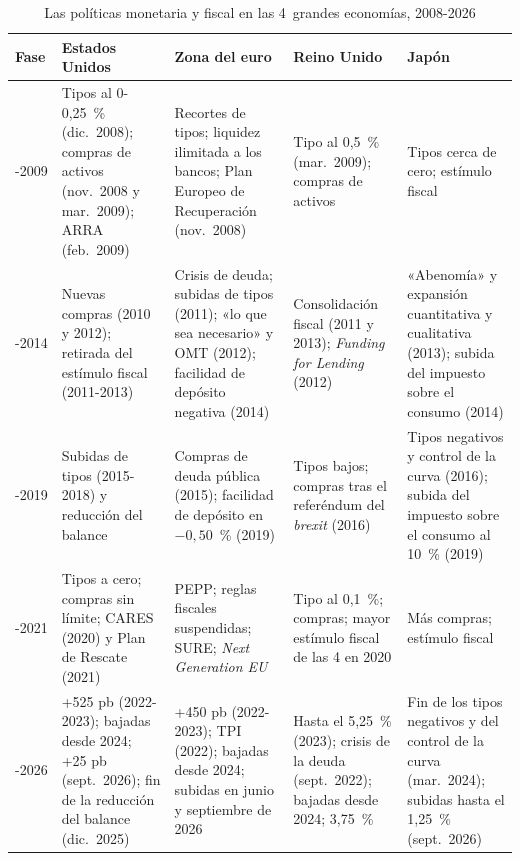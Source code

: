 \documentclass[11pt]{article}
\begin{document}
\begin{table}[H]
\centering
\caption{Las políticas monetaria y fiscal en las 4~grandes economías, 2008-2026}\label{tab:cronologia}
\footnotesize
\begin{tabular}{>{\centering\arraybackslash}m{1.5cm}|>{\raggedright\arraybackslash}m{3.4cm}|>{\raggedright\arraybackslash}m{3.4cm}|>{\raggedright\arraybackslash}m{3.0cm}|>{\raggedright\arraybackslash}m{3.0cm}}
\rowcolor{tceeazulpalido}\textbf{Fase} & \textbf{Estados Unidos} & \textbf{Zona del euro} & \textbf{Reino Unido} & \textbf{Japón}\\
\hline
2008-2009 & Tipos al 0-0,25~\% (dic.~2008); compras de activos (nov.~2008 y mar.~2009); ARRA (feb.~2009) & Recortes de tipos; liquidez ilimitada a los bancos; Plan Europeo de Recuperación (nov.~2008) & Tipo al 0,5~\% (mar.~2009); compras de activos & Tipos cerca de cero; estímulo fiscal\\
\hline
2010-2014 & Nuevas compras (2010 y 2012); retirada del estímulo fiscal (2011-2013) & Crisis de deuda; subidas de tipos (2011); «lo que sea necesario» y OMT (2012); facilidad de depósito negativa (2014) & Consolidación fiscal (2011 y 2013); \emph{Funding for Lending} (2012) & «Abenomía» y expansión cuantitativa y cualitativa (2013); subida del impuesto sobre el consumo (2014)\\
\hline
2015-2019 & Subidas de tipos (2015-2018) y reducción del balance & Compras de deuda pública (2015); facilidad de depósito en $-0{,}50$~\% (2019) & Tipos bajos; compras tras el referéndum del \emph{brexit} (2016) & Tipos negativos y control de la curva (2016); subida del impuesto sobre el consumo al 10~\% (2019)\\
\hline
2020-2021 & Tipos a cero; compras sin límite; CARES (2020) y Plan de Rescate (2021) & PEPP; reglas fiscales suspendidas; SURE; \emph{Next Generation EU} & Tipo al 0,1~\%; compras; mayor estímulo fiscal de las 4 en 2020 & Más compras; estímulo fiscal\\
\hline
2022-2026 & +525 pb (2022-2023); bajadas desde 2024; +25 pb (sept.~2026); fin de la reducción del balance (dic.~2025) & +450 pb (2022-2023); TPI (2022); bajadas desde 2024; subidas en junio y septiembre de 2026 & Hasta el 5,25~\% (2023); crisis de la deuda (sept.~2022); bajadas desde 2024; 3,75~\% & Fin de los tipos negativos y del control de la curva (mar.~2024); subidas hasta el 1,25~\% (sept.~2026)\\
\hline
\end{tabular}
\end{table}
\end{document}
